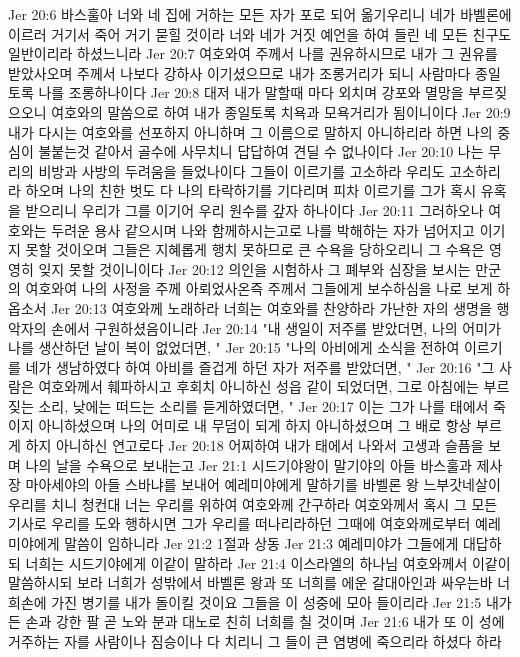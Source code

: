 Jer 20:6  바스훌아 너와 네 집에 거하는 모든 자가 포로 되어 옮기우리니 네가 바벨론에 이르러 거기서 죽어 거기 묻힐 것이라 너와 네가 거짓 예언을 하여 들린 네 모든 친구도 일반이리라 하셨느니라
Jer 20:7  여호와여 주께서 나를 권유하시므로 내가 그 권유를 받았사오며 주께서 나보다 강하사 이기셨으므로 내가 조롱거리가 되니 사람마다 종일토록 나를 조롱하나이다
Jer 20:8  대저 내가 말할때 마다 외치며 강포와 멸망을 부르짖으오니 여호와의 말씀으로 하여 내가 종일토록 치욕과 모욕거리가 됨이니이다
Jer 20:9  내가 다시는 여호와를 선포하지 아니하며 그 이름으로 말하지 아니하리라 하면 나의 중심이 불붙는것 같아서 골수에 사무치니 답답하여 견딜 수 없나이다
Jer 20:10  나는 무리의 비방과 사방의 두려움을 들었나이다 그들이 이르기를 고소하라 우리도 고소하리라 하오며 나의 친한 벗도 다 나의 타락하기를 기다리며 피차 이르기를 그가 혹시 유혹을 받으리니 우리가 그를 이기어 우리 원수를 갚자 하나이다
Jer 20:11  그러하오나 여호와는 두려운 용사 같으시며 나와 함께하시는고로 나를 박해하는 자가 넘어지고 이기지 못할 것이오며 그들은 지혜롭게 행치 못하므로 큰 수욕을 당하오리니 그 수욕은 영영히 잊지 못할 것이니이다
Jer 20:12  의인을 시험하사 그 폐부와 심장을 보시는 만군의 여호와여 나의 사정을 주께 아뢰었사온즉 주께서 그들에게 보수하심을 나로 보게 하옵소서
Jer 20:13  여호와께 노래하라 너희는 여호와를 찬양하라 가난한 자의 생명을 행악자의 손에서 구원하셨음이니라
Jer 20:14  "내 생일이 저주를 받았더면, 나의 어미가 나를 생산하던 날이 복이 없었더면, "
Jer 20:15  "나의 아비에게 소식을 전하여 이르기를 네가 생남하였다 하여 아비를 즐겁게 하던 자가 저주를 받았더면, "
Jer 20:16  "그 사람은 여호와께서 훼파하시고 후회치 아니하신 성읍 같이 되었더면, 그로 아침에는 부르짖는 소리, 낮에는 떠드는 소리를 듣게하였더면, "
Jer 20:17  이는 그가 나를 태에서 죽이지 아니하셨으며 나의 어미로 내 무덤이 되게 하지 아니하셨으며 그 배로 항상 부르게 하지 아니하신 연고로다
Jer 20:18  어찌하여 내가 태에서 나와서 고생과 슬픔을 보며 나의 날을 수욕으로 보내는고
Jer 21:1  시드기야왕이 말기야의 아들 바스훌과 제사장 마아세야의 아들 스바냐를 보내어 예레미야에게 말하기를 바벨론 왕 느부갓네살이 우리를 치니 청컨대 너는 우리를 위하여 여호와께 간구하라 여호와께서 혹시 그 모든 기사로 우리를 도와 행하시면 그가 우리를 떠나리라하던 그때에 여호와께로부터 예레미야에게 말씀이 임하니라
Jer 21:2  1절과 상동
Jer 21:3  예레미야가 그들에게 대답하되 너희는 시드기야에게 이같이 말하라
Jer 21:4  이스라엘의 하나님 여호와께서 이같이 말씀하시되 보라 너희가 성밖에서 바벨론 왕과 또 너희를 에운 갈대아인과 싸우는바 너희손에 가진 병기를 내가 돌이킬 것이요 그들을 이 성중에 모아 들이리라
Jer 21:5  내가 든 손과 강한 팔 곧 노와 분과 대노로 친히 너희를 칠 것이며
Jer 21:6  내가 또 이 성에 거주하는 자를 사람이나 짐승이나 다 치리니 그 들이 큰 염병에 죽으리라 하셨다 하라
